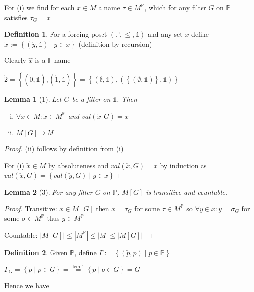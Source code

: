 \documentclass{scrartcl}
\newcommand{\set}[1]{\left\{#1\right\}}
\theoremstyle{definition}
\newtheorem*{definition*}{Definition}
\theoremstyle{plain}
\newtheorem*{lemma*}{Lemma}
\theoremstyle{remark}
\begin{document}
	For (i) we find for each $x \in M$ a name $\tau \in M^\mathbb{P}$, which for
	any filter $G$ on $\mathbb{P}$ satisfies $\tau_G = x$

	\begin{definition*}
	For a forcing poset $(\mathbb{P}, \leq, \mathbb{1})$ and any set $x$
	define $\check{x} := \set{(\check{y}, \mathbb{1}) \mid y \in x}$ (definition by
	recursion)
		
	Clearly $\hat{x}$ is a $\mathbb{P}$-name

	$\check{2} = \set{(\check{0}, \mathbb{1}), (\check{1}, \mathbb{1})} = 
	\set{(\emptyset, \mathbb{1}), (\set{(\emptyset, \mathbb{1})}, \mathbb{1})}$
	\end{definition*}
	
	\begin{lemma*}[1]
		Let $G$ be a filter  on $\mathbb{1}$. Then 
		\begin{enumerate}[(i)]
			\item $\forall x \in M: \check{x} \in M^\mathbb{P}$ and $val(\check{x}, G) = x$
			
			\item $M[G] \supseteq M$ 
		\end{enumerate}
	\end{lemma*}
		
	\begin{proof}
		(ii) follows by definition from (i)

		For (i) $\check{x} \in M$ by absoluteness and $val(\check{x}, G) = x$ by
		induction as $val(\check{x}, G) = \set{val(\check{y}, G) \mid y \in x}$ 
	\end{proof}
	
	\begin{lemma*}[3]
		For any filter $G$ on $\mathbb{P}$, $M[G]$ is transitive and countable.
	\end{lemma*}

	\begin{proof}
		Transitive: $x \in M[G]$ then $x = \tau_G$ for some $\tau \in M^\mathbb{P}$
		so $\forall y \in x: y = \sigma_G$ for some $\sigma \in M^\mathbb{P}$ thus
		$y \in M^\mathbb{P}$

		Countable: $|M[G]| \leq |M^\mathbb{P}| \leq |M| \leq |M[G]|$
	\end{proof}

	\begin{definition*}
		Given $\mathbb{P}$, define $\Gamma := \set{(\check{p}, p) \mid p \in \mathbb{P}}$

		$\Gamma_G = \set{\check{p} \mid p \in G} = \overset{\text{lem 1}}{=}
		\set{p \mid p \in G} = G$

		Hence we have 
	\end{definition*}
\end{document}
